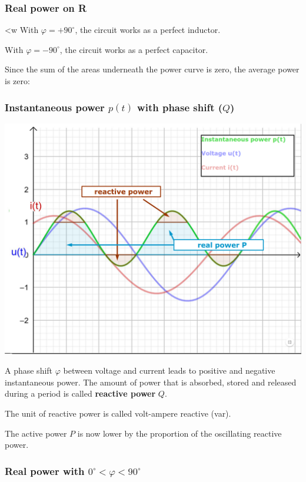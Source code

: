 \documentclass{article}
\begin{document}
\subsubsection{Real power on R}
<w
With $\varphi = +90^{\circ}$, the circuit works as a perfect inductor.

With $\varphi = -90^{\circ}$, the circuit works as a perfect capacitor.

Since the sum of the areas underneath the power curve is zero, the
average power is zero:

\subsubsection{Instantaneous power $p(t)$ with phase shift ($Q$)}
\begin{center}
    \includegraphics[width=.7\textwidth]{media/instant_power_phaseshift.png}
\end{center}
A phase shift $\varphi$ between voltage and current leads to positive
and negative instantaneous power. The amount of power that is absorbed,
stored and released during a period is called \textbf{reactive power} $Q$.

The unit of reactive power is called volt-ampere reactive (var).

The active power $P$ is now lower by the proportion of the oscillating
reactive power.

\subsubsection{Real power with $0^{\circ} < \varphi < 90^{\circ}$}
\end{document}
